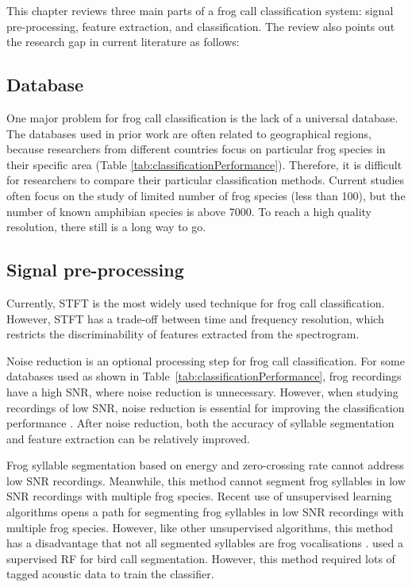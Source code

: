 This chapter reviews three main parts of a frog call classification system: signal pre-processing, feature extraction, and classification. The review also points out the research gap in current literature as follows:

\subsection{Database}
One major problem for frog call classification is the lack of a universal database. The databases used in prior work are often related to geographical regions, because researchers from different countries focus on particular frog species in their specific area (Table \ref{tab:classificationPerformance}). Therefore, it is difficult for researchers to compare their particular classification methods. Current studies often focus on the study of limited number of frog species (less than 100), but the number of known amphibian species is above 7000. To reach a high quality resolution, there still is a long way to go.


\subsection{Signal pre-processing}
Currently, STFT is the most widely used technique for frog call classification. However, STFT has a trade-off between time and frequency resolution, which restricts the discriminability of features extracted from the spectrogram. 

Noise reduction is an optional processing step for frog call classification. For some databases used as shown in Table~\ref{tab:classificationPerformance}, frog recordings have a high SNR, where noise reduction is unnecessary. However, when studying recordings of low SNR, noise reduction is essential for improving the classification performance \citep{bedoya2014automatic, Huang20141}. After noise reduction, both the accuracy of syllable segmentation and feature extraction can be relatively improved.

Frog syllable segmentation based on energy and zero-crossing rate cannot address low SNR recordings. Meanwhile, this method cannot segment frog syllables in low SNR recordings with multiple frog species. Recent use of unsupervised learning algorithms opens a path for segmenting frog syllables in low SNR recordings with multiple frog species. However, like other unsupervised algorithms, this method has a disadvantage that not all segmented syllables are frog vocalisations \citep{potamitis2015unsupervised}. \citet{briggs2012acoustic} used a supervised RF for bird call segmentation. However, this method required lots of tagged acoustic data to train the classifier.

